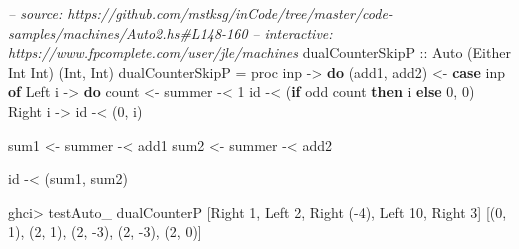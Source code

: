 \documentclass[]{article}
\newenvironment{Shaded}{}{}
\newcommand{\KeywordTok}[1]{\textcolor[rgb]{0.00,0.44,0.13}{\textbf{{#1}}}}
\newcommand{\DataTypeTok}[1]{\textcolor[rgb]{0.56,0.13,0.00}{{#1}}}
\newcommand{\DecValTok}[1]{\textcolor[rgb]{0.25,0.63,0.44}{{#1}}}
\newcommand{\CommentTok}[1]{\textcolor[rgb]{0.38,0.63,0.69}{\textit{{#1}}}}
\newcommand{\OtherTok}[1]{\textcolor[rgb]{0.00,0.44,0.13}{{#1}}}
\newcommand{\FunctionTok}[1]{\textcolor[rgb]{0.02,0.16,0.49}{{#1}}}
\newcommand{\NormalTok}[1]{{#1}}
\begin{document}
\begin{Shaded}
\begin{Highlighting}[]
\CommentTok{-- source: https://github.com/mstksg/inCode/tree/master/code-samples/machines/Auto2.hs#L148-160}
\CommentTok{-- interactive: https://www.fpcomplete.com/user/jle/machines}
\OtherTok{dualCounterSkipP ::} \DataTypeTok{Auto} \NormalTok{(}\DataTypeTok{Either} \DataTypeTok{Int} \DataTypeTok{Int}\NormalTok{) (}\DataTypeTok{Int}\NormalTok{, }\DataTypeTok{Int}\NormalTok{)}
\NormalTok{dualCounterSkipP }\FunctionTok{=} \NormalTok{proc inp }\OtherTok{->} \KeywordTok{do}
    \NormalTok{(add1, add2) }\OtherTok{<-} \KeywordTok{case} \NormalTok{inp }\KeywordTok{of}
                      \DataTypeTok{Left} \NormalTok{i }\OtherTok{->} \KeywordTok{do}
                        \NormalTok{count }\OtherTok{<-} \NormalTok{summer }\FunctionTok{-<} \DecValTok{1}
                        \NormalTok{id }\FunctionTok{-<} \NormalTok{(}\KeywordTok{if} \NormalTok{odd count }\KeywordTok{then} \NormalTok{i }\KeywordTok{else} \DecValTok{0}\NormalTok{, }\DecValTok{0}\NormalTok{)}
                      \DataTypeTok{Right} \NormalTok{i }\OtherTok{->}
                        \NormalTok{id }\FunctionTok{-<} \NormalTok{(}\DecValTok{0}\NormalTok{, i)}

    \NormalTok{sum1 }\OtherTok{<-} \NormalTok{summer }\FunctionTok{-<} \NormalTok{add1}
    \NormalTok{sum2 }\OtherTok{<-} \NormalTok{summer }\FunctionTok{-<} \NormalTok{add2}

    \NormalTok{id }\FunctionTok{-<} \NormalTok{(sum1, sum2)}
\end{Highlighting}
\end{Shaded}

\begin{Shaded}
\begin{Highlighting}[]
\NormalTok{ghci}\FunctionTok{>} \NormalTok{testAuto_ dualCounterP [}\DataTypeTok{Right} \DecValTok{1}\NormalTok{, }\DataTypeTok{Left} \DecValTok{2}\NormalTok{, }\DataTypeTok{Right} \NormalTok{(}\FunctionTok{-}\DecValTok{4}\NormalTok{), }\DataTypeTok{Left} \DecValTok{10}\NormalTok{, }\DataTypeTok{Right} \DecValTok{3}\NormalTok{]}
\NormalTok{[(}\DecValTok{0}\NormalTok{, }\DecValTok{1}\NormalTok{), (}\DecValTok{2}\NormalTok{, }\DecValTok{1}\NormalTok{), (}\DecValTok{2}\NormalTok{, }\FunctionTok{-}\DecValTok{3}\NormalTok{), (}\DecValTok{2}\NormalTok{, }\FunctionTok{-}\DecValTok{3}\NormalTok{), (}\DecValTok{2}\NormalTok{, }\DecValTok{0}\NormalTok{)]}
\end{Highlighting}
\end{Shaded}
\end{document}
